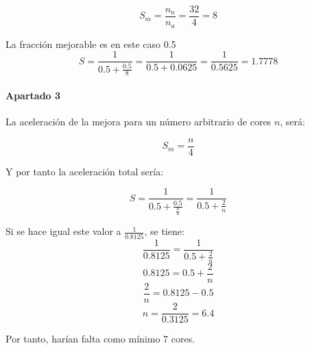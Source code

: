 \[
S_m = \frac{n_n}{n_a} = \frac{32}{4} = 8
\]

La fracción mejorable es en este caso 0.5
\[
S = \frac{1}{0.5 + \frac{0.5}{8}} = \frac{1}{0.5 + 0.0625} = \frac{1}{0.5625} = 1.7778
\]

\paragraph{Apartado 3}
La aceleración de la mejora para un número arbitrario de cores $n$, será:

\[
S_m = \frac{n}{4}
\]

Y por tanto la aceleración total sería:

\[
S = \frac{1}{0.5 + 
\frac{0.5}{\frac{n}{4}}} = 
\frac{1}{0.5 + \frac{2}{n}}
\]

Si se hace igual este valor a $\frac{1}{0.8125}$, se tiene:
\[
\frac{1}{0.8125} = \frac{1}{0.5+\frac{2}{n}}
\]
\[ 0.8125 = 0.5 + \frac{2}{n} \]
\[ \frac{2}{n} = 0.8125 - 0.5 \]
\[ n = \frac{2}{0.3125} = 6.4 \]

Por tanto, harían falta como mínimo 7 cores.

